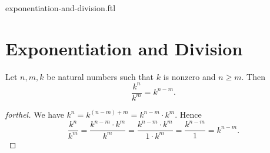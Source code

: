 \documentclass{naproche-library}
\begin{document}
\begin{smodule}{exponentiation-and-division.ftl}

  \section*{Exponentiation and Division}

  \begin{proposition}[forthel,id=ARITHMETIC_14_2345102698451257]
    Let $n, m, k$ be natural numbers such that $k$ is nonzero and $n \geq m$.
    Then \[\frac{k^{n}}{k^{m}} = k^{n - m}.\]
  \end{proposition}
  \begin{proof}[forthel]
    We have $k^{n} = k^{(n - m) + m} = k^{n - m} \cdot k^{m}$.
    Hence
    \[  \frac{k^{n}}{k^{m}}
        = \frac{k^{n - m} \cdot k^{m}}{k^{m}}
        = \frac{k^{n - m} \cdot k^{m}}{1 \cdot k^{m}}
        = \frac{k^{n - m}}{1}
        = k^{n - m}. \]
  \end{proof}
\end{smodule}
\end{document}
